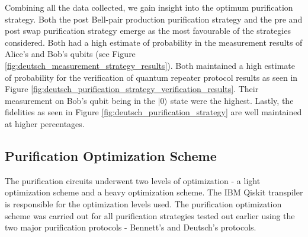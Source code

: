 \documentclass[11pt]{article}
\begin{document}
Combining all the data collected, we gain insight into the optimum purification strategy. Both the post Bell-pair production purification strategy and the pre and post swap purification strategy emerge as the most favourable of the strategies considered. Both had a high estimate of probability in the measurement results of Alice's and Bob's qubits (see Figure \ref{fig:deutsch_measurement_strategy_results}). Both maintained a high estimate of probability for the verification of quantum repeater protocol results as seen in Figure \ref{fig:deutsch_purification_strategy_verification_results}. Their measurement on Bob's qubit being in the $|0\rangle$ state were the highest. Lastly, the fidelities as seen in Figure \ref{fig:deutsch_purification_strategy} are well maintained at higher percentages.

\subsection{Purification Optimization Scheme}
The purification circuits underwent two levels of optimization - a light optimization scheme and a heavy optimization scheme. The IBM Qiskit transpiler is responsible for the optimization levels used. The purification optimization scheme was carried out for all purification strategies tested out earlier using the two major purification protocols - Bennett's and Deutsch's protocols.
\end{document}
